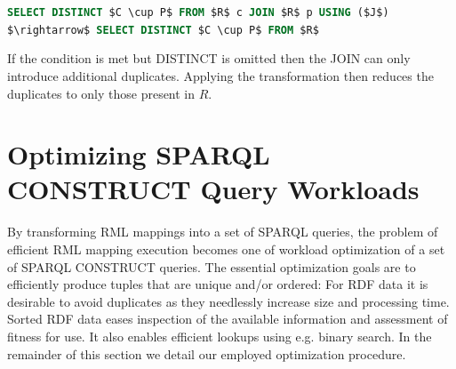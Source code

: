\lstinline[language=SQL,basicstyle=\footnotesize,mathescape=true]!SELECT DISTINCT $C \cup P$ FROM $R$ c JOIN $R$ p USING ($J$) $\rightarrow$ SELECT DISTINCT $C \cup P$ FROM $R$!

\noindent If the condition is met but DISTINCT is omitted then the JOIN can only introduce additional duplicates. Applying the transformation then reduces the duplicates to only those present in $R$.


\section{Optimizing SPARQL CONSTRUCT Query Workloads}
\label{sec:optimize}
By transforming RML mappings into a set of SPARQL queries, the problem of efficient RML mapping execution becomes one
of workload optimization of a set of SPARQL CONSTRUCT queries.
The essential optimization goals are to efficiently produce tuples that are
unique and/or ordered: For RDF data it is desirable to avoid duplicates as they needlessly increase size and processing time.
Sorted RDF data eases inspection of the available information and assessment of fitness for use. It also enables efficient lookups using e.g. binary search. In the remainder of this section we detail our employed optimization procedure.



